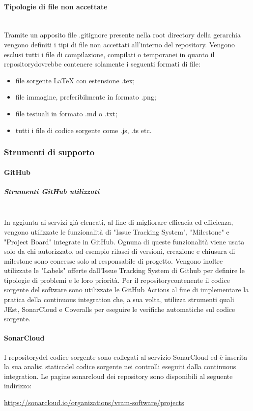 	\paragraph{Tipologie di file non accettate}\mbox{}\\ [1mm]
		Tramite un apposito file .gitignore presente nella root directory della gerarchia vengono definiti i tipi di file non accettati all'interno del repository\glo. Vengono esclusi tutti i file di compilazione, compilati o temporanei in quanto il repository\glosp dovrebbe contenere solamente i seguenti formati di file:
		\begin{itemize}
			\item file sorgente \LaTeX \xspace con estensione .tex;
			\item file immagine, preferibilmente in formato .png;
			\item file testuali in formato .md o .txt;
			\item tutti i file di codice sorgente come .js, .ts etc.		
		\end{itemize}
	\subsubsection{Strumenti di supporto}
	\paragraph{GitHub}
	\subparagraph*{Strumenti GitHub utilizzati}\mbox{}\\ [1mm]
		In aggiunta ai servizi già elencati, al fine di migliorare efficacia ed efficienza, vengono utilizzate le funzionalità di "Issue Tracking System",  
		"Milestone" e "Project Board" integrate in GitHub. Ognuna di queste funzionalità viene usata solo da chi autorizzato, ad esempio rilasci di versioni, creazione e chiusura di milestone sono concesse solo al responsabile di progetto\glo.
		\newline
		Vengono inoltre utilizzate le "Labels" offerte dall'Issue Tracking System di Github per definire le tipologie di problemi e le loro priorità.
		\newline
		Per il repository\glosp contenente il codice sorgente del software sono utilizzate le GitHub Actions al fine di implementare la pratica della continuous integration che, a sua volta, utilizza strumenti quali JEst, SonarCloud e Coveralls per eseguire le verifiche automatiche sul codice sorgente.
	\paragraph{SonarCloud}
	I repository\glosp del codice sorgente sono collegati al servizio SonarCloud ed è inserita la sua analisi statica\glosp del codice sorgente nei controlli eseguiti dalla continuous integration. Le pagine sonarcloud dei repository sono disponibili al seguente indirizzo: 
	\begin{center}
		\url{https://sonarcloud.io/organizations/vram-software/projects}
	\end{center}
